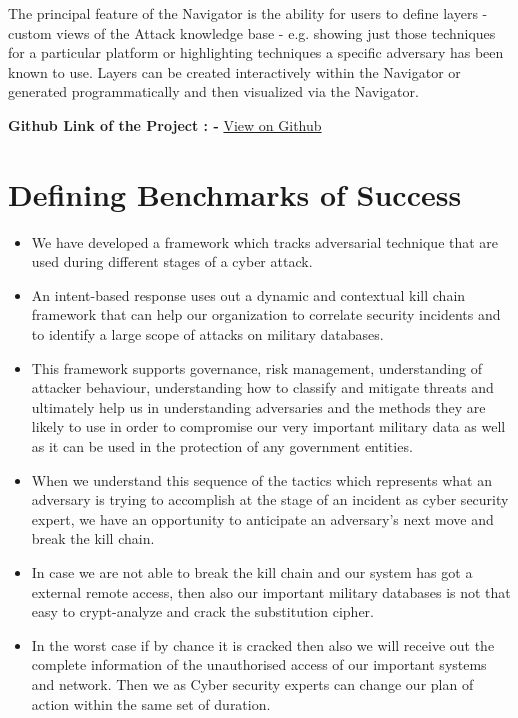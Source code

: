 \documentclass{article}
\begin{document}
The principal feature of the Navigator is the ability for users to define layers - custom views of the Attack knowledge base - e.g. showing just those techniques for a particular platform or highlighting techniques a specific adversary has been known to use. Layers can be created interactively within the Navigator or generated programmatically and then visualized via the Navigator.

\begin{center}
   \textbf{Github Link of the Project : -}
\href{https://github.com/mitarth-arora/Attack-Navigator.git}{View on Github}
\end{center}
\section{Defining Benchmarks of Success}
\begin{itemize}
\item We have developed a framework which tracks adversarial technique that are used during different stages of a cyber attack.
\item An intent-based response uses out a dynamic and contextual kill chain framework that can help our organization to correlate security incidents and to identify a large scope of attacks on military databases. 
\item  This framework supports governance, risk management, understanding of attacker behaviour, understanding how to classify and mitigate threats and ultimately help us in understanding adversaries and the methods they are likely to use in order to compromise our very important military data as well as it can be used in the protection of any government entities. 
\item When we understand this sequence of the tactics which represents what an adversary is trying to accomplish at the stage of an incident as cyber security expert, we have an opportunity to anticipate an adversary's next move and break the kill chain.
\item  In case we are not able to break the kill chain and our system has got a external remote access, then also our important military databases is not that easy to crypt-analyze and crack the substitution cipher.
\item In the worst case if by chance it is cracked then also we will receive out the complete information of the unauthorised access of our important systems and network. Then we as Cyber security experts can change our plan of action within the same set of duration.
\end{itemize}
\end{document}
